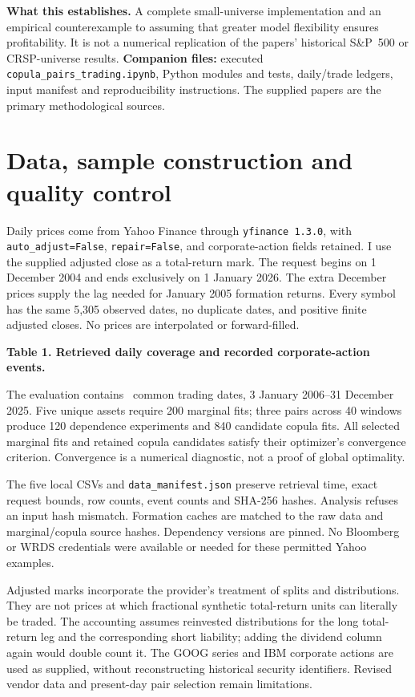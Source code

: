 \documentclass[11pt,letterpaper]{article}
\newcommand{\resulttable}[2]{\textbf{#1}\begin{center}\small\end{center}}
\begin{document}
\textbf{What this establishes.} A complete small-universe implementation and an empirical counterexample to assuming that greater model flexibility ensures profitability. It is not a numerical replication of the papers' historical S\&P~500 or CRSP-universe results.
\vfill
\textbf{Companion files:} executed \texttt{copula\_pairs\_trading.ipynb}, Python modules and tests, daily/trade ledgers, input manifest and reproducibility instructions. The supplied papers are the primary methodological sources.

\clearpage
\section{Data, sample construction and quality control}
Daily prices come from Yahoo Finance through \texttt{yfinance 1.3.0}, with \texttt{auto\_adjust=False}, \texttt{repair=False}, and corporate-action fields retained. I use the supplied adjusted close as a total-return mark. The request begins on 1 December 2004 and ends exclusively on 1 January 2026. The extra December prices supply the lag needed for January 2005 formation returns. Every symbol has the same 5,305 observed dates, no duplicate dates, and positive finite adjusted closes. No prices are interpolated or forward-filled.

\resulttable{Table 1. Retrieved daily coverage and recorded corporate-action events.}{coverage}
The evaluation contains \OOSDays\ common trading dates, 3 January 2006--31 December 2025. Five unique assets require 200 marginal fits; three pairs across 40 windows produce 120 dependence experiments and 840 candidate copula fits. All selected marginal fits and retained copula candidates satisfy their optimizer's convergence criterion. Convergence is a numerical diagnostic, not a proof of global optimality.

The five local CSVs and \texttt{data\_manifest.json} preserve retrieval time, exact request bounds, row counts, event counts and SHA-256 hashes. Analysis refuses an input hash mismatch. Formation caches are matched to the raw data and marginal/copula source hashes. Dependency versions are pinned. No Bloomberg or WRDS credentials were available or needed for these permitted Yahoo examples.

Adjusted marks incorporate the provider's treatment of splits and distributions. They are not prices at which fractional synthetic total-return units can literally be traded. The accounting assumes reinvested distributions for the long total-return leg and the corresponding short liability; adding the dividend column again would double count it. The GOOG series and IBM corporate actions are used as supplied, without reconstructing historical security identifiers. Revised vendor data and present-day pair selection remain limitations.
\end{document}
